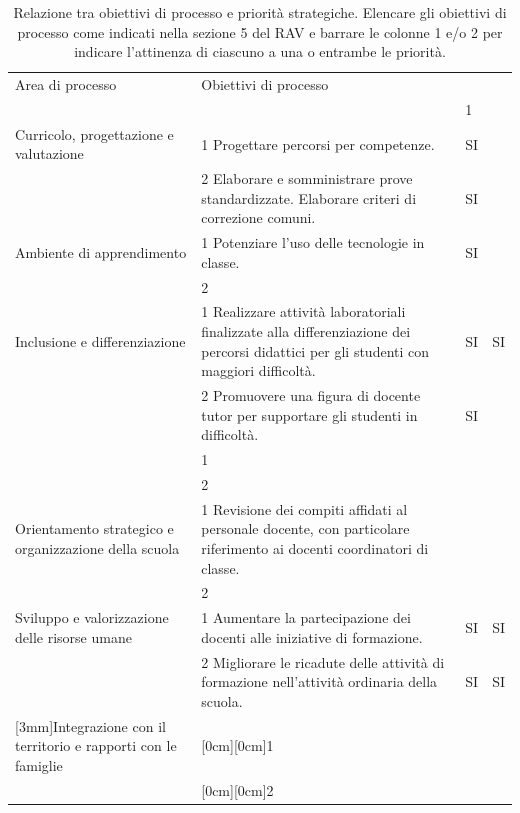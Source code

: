 \documentclass[12pt,a4paper,oneside]{memoir}
\begin{document}
\begin{table}[htp]
\caption{Relazione tra obiettivi di processo e priorità strategiche. Elencare gli obiettivi di processo come indicati nella sezione 5 del RAV e barrare le colonne 1 e/o 2 per indicare l'attinenza di ciascuno a una o entrambe le priorità.}  \label{obiettivi-e-priorità}
\footnotesize
\begin{tabular}{|>{\raggedright}p{}|>{\raggedright}p{5.9cm}|>{\raggedright}p{0.975cm}|>{\raggedright\arraybackslash}p{0.975cm}|}
\hline
\rowcolor{violetto}
Area di processo&Obiettivi di processo&\multicolumn{2}{c|}{Priorità \ldots}\\\cline{3-4}
\rowcolor{violetto}
&&1&2\\\hline
Curricolo, progettazione e valutazione&1 Progettare percorsi per competenze.&SI&\\\cline{2-4}
&2 Elaborare e somministrare prove standardizzate. Elaborare criteri di correzione comuni.&SI&\\\hline
Ambiente di apprendimento&1 Potenziare l'uso delle tecnologie in classe.&SI&\\\cline{2-4}
&2&&\\\hline
Inclusione e differenziazione&1 Realizzare attività laboratoriali finalizzate alla differenziazione dei percorsi didattici per gli studenti con maggiori difficoltà.&SI&SI\\\cline{2-4}
&2 Promuovere una figura di docente tutor per supportare gli studenti in difficoltà.&SI&\\\hline
\multirow{2}{35mm}{Continuità e orientamento}&1&&\\\cline{2-4}
&2&&\\\hline
Orientamento strategico e organizzazione della scuola&1 Revisione dei compiti affidati al personale docente, con particolare riferimento ai docenti coordinatori di classe.&&\\\cline{2-4}
&2&&\\\hline
Sviluppo e valorizzazione delle risorse umane&1 Aumentare la partecipazione dei docenti alle iniziative di formazione.&SI&SI\\\cline{2-4}
&2 Migliorare le ricadute delle attività di formazione nell'attività ordinaria della scuola.&SI&SI\\\hline
\multirow{2}{35mm}[3mm]{Integrazione con il territorio e rapporti con le famiglie}&\raisebox{1.6ex}[0cm][0cm]{1} \rule{0em}{3.5ex}&&\\\cline{2-4}
&\raisebox{1.6ex}[0cm][0cm]{2} \rule{0em}{3.5ex}&&\\\hline
\end{tabular}
\end{table}
\end{document}
